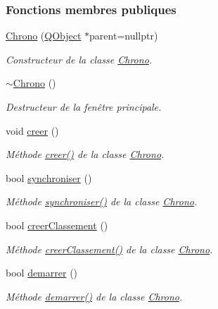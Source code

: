 \subsubsection*{Fonctions membres publiques}
\begin{DoxyCompactItemize}
\item 
\hyperlink{class_chrono_a01eb40847915c49c48c7dc9ca63cbd99}{Chrono} (\hyperlink{class_q_object}{Q\+Object} $\ast$parent=nullptr)
\begin{DoxyCompactList}\small\item\em Constructeur de la classe \hyperlink{class_chrono}{Chrono}. \end{DoxyCompactList}\item 
\hyperlink{class_chrono_aaba59dd29fe5d3469c147cd2b014adc1}{$\sim$\+Chrono} ()
\begin{DoxyCompactList}\small\item\em Destructeur de la fenêtre principale. \end{DoxyCompactList}\item 
void \hyperlink{class_chrono_a74d85a4e856e2e59afacaa061feb7b75}{creer} ()
\begin{DoxyCompactList}\small\item\em Méthode \hyperlink{class_chrono_a74d85a4e856e2e59afacaa061feb7b75}{creer()} de la classe \hyperlink{class_chrono}{Chrono}. \end{DoxyCompactList}\item 
bool \hyperlink{class_chrono_a858a209a6d366b3adb95bcf593645d6a}{synchroniser} ()
\begin{DoxyCompactList}\small\item\em Méthode \hyperlink{class_chrono_a858a209a6d366b3adb95bcf593645d6a}{synchroniser()} de la classe \hyperlink{class_chrono}{Chrono}. \end{DoxyCompactList}\item 
bool \hyperlink{class_chrono_a0d7e3e50fcef0f2b0b7bfadc3d4f737d}{creer\+Classement} ()
\begin{DoxyCompactList}\small\item\em Méthode \hyperlink{class_chrono_a0d7e3e50fcef0f2b0b7bfadc3d4f737d}{creer\+Classement()} de la classe \hyperlink{class_chrono}{Chrono}. \end{DoxyCompactList}\item 
bool \hyperlink{class_chrono_a2ee875c24eb14f09011a40dfb3f1921f}{demarrer} ()
\begin{DoxyCompactList}\small\item\em Méthode \hyperlink{class_chrono_a2ee875c24eb14f09011a40dfb3f1921f}{demarrer()} de la classe \hyperlink{class_chrono}{Chrono}. \end{DoxyCompactList}\item 

\end{DoxyCompactItemize}
